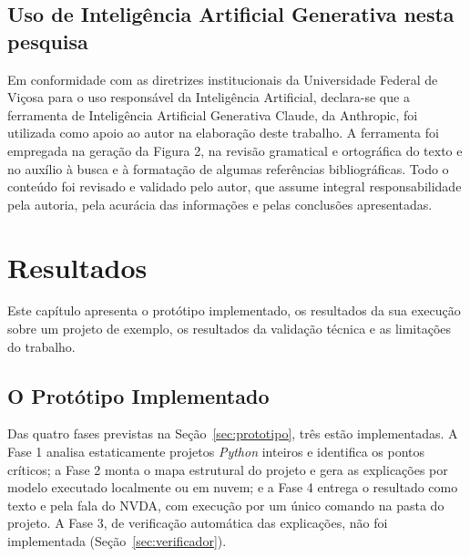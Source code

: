 \documentclass[
    12pt,                   %
    openright,              %
    oneside,                %
    a4paper,                %
    sumario=tradicional,    %
    english,                %
    brazil,                 %
    ]{abntex2}
\begin{document}


\section{Uso de Inteligência Artificial Generativa nesta pesquisa}\label{sec:usoia}

Em conformidade com as diretrizes institucionais da Universidade Federal de Viçosa para o uso responsável da Inteligência Artificial, declara-se que a ferramenta de Inteligência Artificial Generativa Claude, da Anthropic, foi utilizada como apoio ao autor na elaboração deste trabalho. A ferramenta foi empregada na geração da Figura 2, na revisão gramatical e ortográfica do texto e no auxílio à busca e à formatação de algumas referências bibliográficas. Todo o conteúdo foi revisado e validado pelo autor, que assume integral responsabilidade pela autoria, pela acurácia das informações e pelas conclusões apresentadas.

\chapter{Resultados}\label{sec:resultados}

Este capítulo apresenta o protótipo implementado, os resultados da sua execução sobre um projeto de exemplo, os resultados da validação técnica e as limitações do trabalho.

\section{O Protótipo Implementado}\label{sec:implementado}

Das quatro fases previstas na Seção~\ref{sec:prototipo}, três estão implementadas. A Fase 1 analisa estaticamente projetos \textit{Python} inteiros e identifica os pontos críticos; a Fase 2 monta o mapa estrutural do projeto e gera as explicações por modelo executado localmente ou em nuvem; e a Fase 4 entrega o resultado como texto e pela fala do NVDA, com execução por um único comando na pasta do projeto. A Fase 3, de verificação automática das explicações, não foi implementada (Seção~\ref{sec:verificador}).
\end{document}
